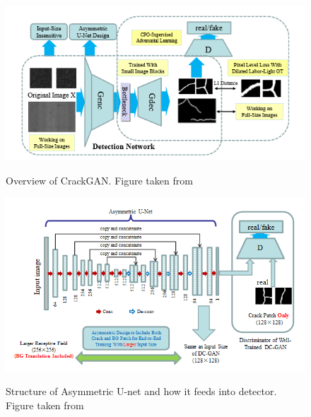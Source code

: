 \documentclass[11pt]{article}		%
\newlength{\imageheight}	 %
\begin{document}
	        \begin{figure}[h]
				\centering
				\begin{multicols}{2}
					\includegraphics[height=\imageheight]{CrackGan_Overview}
					\caption{Overview of CrackGAN. Figure taken from \cite{CrackGAN1}}
					\label{crackGAN_Overview}
					\columnbreak
					\includegraphics[height=\imageheight]{assymmetric_unet}
					\caption{Structure of Asymmetric U-net and how it feeds into detector. Figure taken from \cite{CrackGAN1}}
					\label{assymmetric-unet}
			 \end{multicols}
			\end{figure}	
    		
\end{document}
